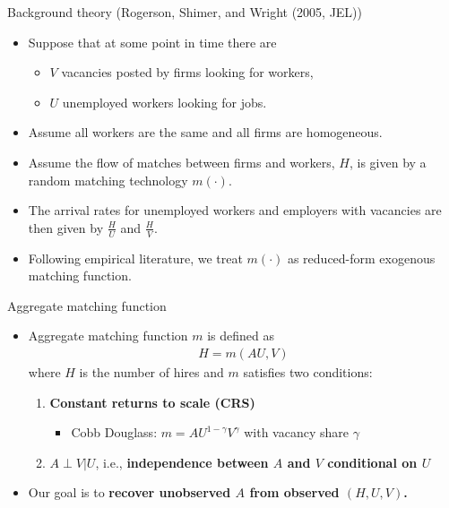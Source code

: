 \documentclass[aspectratio=169]{beamer}
\begin{document}
\begin{frame}{Background theory (Rogerson, Shimer, and Wright (2005, JEL))}
    \begin{itemize}
        \item Suppose that at some point in time there are 
        \begin{itemize}
            \item $V$ vacancies posted by firms looking for workers,
            \item $U$ unemployed workers looking for jobs. 
        \end{itemize}
        \item Assume all workers are the same and all firms are homogeneous.
        \item Assume the flow of matches between firms and workers, $H$, is given by a random matching technology $m(\cdot)$.        
        \item The arrival rates for unemployed workers and employers with vacancies are then given by $\frac{H}{U}$ and $\frac{H}{V}$.
        \item Following empirical literature, we treat $m(\cdot)$ as reduced-form exogenous matching function.
    \end{itemize}
\end{frame}


\begin{frame}{Aggregate matching function}
\begin{itemize}
    \item Aggregate matching function $m$ is defined as
    \begin{align*}
        H=m(AU,V)
    \end{align*}
    where $H$ is the number of hires and $m$ satisfies two conditions:
    \begin{enumerate}
        \item \textbf{Constant returns to scale (CRS)}
        \begin{itemize}
            \item Cobb Douglass: $m=AU^{1-\gamma}V^{\gamma}$ with vacancy share $\gamma$
        \end{itemize}
        \item $A\perp V|U$, i.e., \textbf{independence between $A$ and $V$ conditional on $U$}
    \end{enumerate}
    
        \item Our goal is to \textbf{recover unobserved $A$ from observed $(H,U,V)$.}
\end{itemize}
    
\end{frame}
\end{document}
